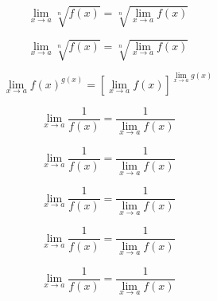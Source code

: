 \begin{equation}
    \lim_{x \to a} \sqrt[n]{f(x)} = \sqrt[n]{\lim_{x \to a} f(x)}
\end{equation}

\begin{equation}
    \lim_{x \to a} \sqrt[n]{f(x)} = \sqrt[n]{\lim_{x \to a} f(x)}
\end{equation}

\begin{equation}
    \lim_{x \to a} f(x)^{g(x)} = \left[\lim_{x \to a} f(x)\right]^{\lim_{x \to a} g(x)}
\end{equation}

\begin{equation}
    \lim_{x \to a} \frac{1}{f(x)} = \frac{1}{\lim_{x \to a} f(x)}
\end{equation}

\begin{equation}
    \lim_{x \to a} \frac{1}{f(x)} = \frac{1}{\lim_{x \to a} f(x)}
\end{equation}

\begin{equation}
    \lim_{x \to a} \frac{1}{f(x)} = \frac{1}{\lim_{x \to a} f(x)}
\end{equation}

\begin{equation}
    \lim_{x \to a} \frac{1}{f(x)} = \frac{1}{\lim_{x \to a} f(x)}
\end{equation}

\begin{equation}
    \lim_{x \to a} \frac{1}{f(x)} = \frac{1}{\lim_{x \to a} f(x)}
\end{equation}
